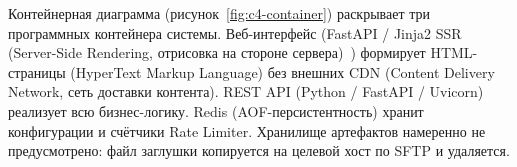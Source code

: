 






Контейнерная диаграмма (рисунок~\ref{fig:c4-container}) раскрывает три программных контейнера системы. Веб-интерфейс (FastAPI / Jinja2 SSR (Server-Side Rendering, отрисовка на стороне сервера)~\cite{jinja2}) формирует HTML-страницы (HyperText Markup Language) без внешних CDN (Content Delivery Network, сеть доставки контента). REST API (Python / FastAPI / Uvicorn) реализует всю бизнес-логику. Redis (AOF-персистентность) хранит конфигурации и счётчики Rate Limiter. Хранилище артефактов намеренно не предусмотрено: файл заглушки копируется на целевой хост по SFTP и удаляется.

